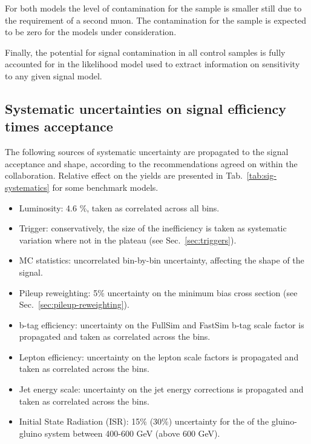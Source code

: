 For both models the level of contamination for the
\mmj sample is smaller still due to the requirement of a second
muon. The contamination for the \gj sample is expected to be zero for
the models under consideration. 

Finally, the potential for signal contamination in all control samples
is fully accounted for in the likelihood model used to extract
information on sensitivity to any given signal model.

\subsection{Systematic uncertainties on signal efficiency times acceptance}
\label{sec:sig-syst}
The following sources of systematic uncertainty are propagated to the signal acceptance and shape, 
according to the recommendations agreed on within the collaboration. 
Relative effect on the yields are presented in Tab.~\ref{tab:sig-systematics} for some benchmark models. 

\begin{itemize}
  \item Luminosity: 4.6 \%, taken as correlated across all bins.
  \item Trigger: conservatively, the size of the inefficiency is taken as systematic variation 
    where not in the plateau (see Sec.~\ref{sec:triggers}). 
  \item MC statistics:  uncorrelated bin-by-bin uncertainty, affecting the shape of the signal. 
  \item Pileup reweighting: 5\% uncertainty on the minimum bias cross section (see Sec.~\ref{sec:pileup-reweighting}).
  \item b-tag efficiency: uncertainty on the FullSim and FastSim b-tag scale factor is propagated and taken as correlated across the bins. 
  \item Lepton efficiency: uncertainty on the lepton scale factors is propagated and taken as correlated across the bins. 
  \item Jet energy scale: uncertainty on the jet energy corrections is propagated and taken as correlated across the bins.
  \item Initial State Radiation (ISR): 15\% (30\%) uncertainty for the \Pt of the gluino-gluino system between 400-600 GeV (above 600 GeV). 
\end{itemize}


